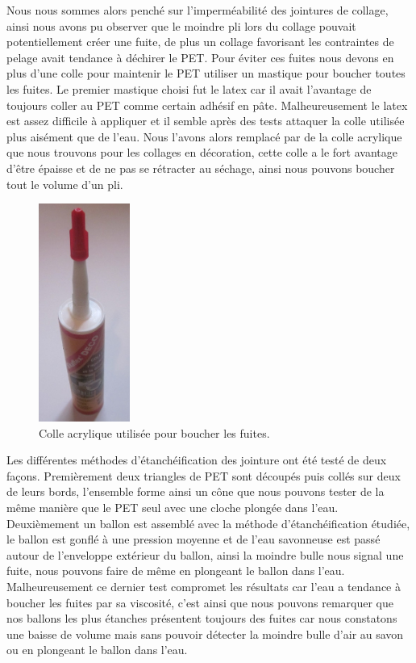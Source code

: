 \documentclass[a4paper,11pt]{article}
\begin{document}
Nous nous sommes alors penché sur l’imperméabilité des jointures de collage, ainsi nous avons pu observer que le moindre pli lors du collage pouvait potentiellement créer une fuite, de plus un collage favorisant les contraintes de pelage avait tendance à déchirer le PET. Pour éviter ces fuites nous devons en plus d'une colle pour maintenir le PET utiliser un mastique pour boucher toutes les fuites. Le premier mastique choisi fut le latex car il avait l'avantage de toujours coller au PET comme certain adhésif en pâte. Malheureusement le latex est assez difficile à appliquer et il semble après des tests attaquer la colle utilisée plus aisément que de l'eau. Nous l'avons alors remplacé par de la colle acrylique que nous trouvons pour les collages en décoration, cette colle a le fort avantage d'être épaisse et de ne pas se rétracter au séchage, ainsi nous pouvons boucher tout le volume d'un pli.

\begin{figure}[H]
 \centering
 \includegraphics[width=3cm]{../Images/colle_acrylique.JPG}
 \caption{Colle acrylique utilisée pour boucher les fuites.}
\end{figure}


Les différentes méthodes d'étanchéification des jointure ont été testé de deux façons.
Premièrement deux triangles de PET sont découpés puis collés sur deux de leurs bords, l'ensemble forme ainsi un cône que nous pouvons tester de la même manière que le PET seul avec une cloche plongée dans l'eau.
Deuxièmement un ballon est assemblé avec la méthode d'étanchéification étudiée, le ballon est gonflé à une pression moyenne et de l'eau savonneuse est passé autour de l'enveloppe extérieur du ballon, ainsi la moindre bulle nous signal une fuite, nous pouvons faire de même en plongeant le ballon dans l'eau. Malheureusement ce dernier test compromet les résultats car l'eau a tendance à boucher les fuites par sa viscosité, c'est ainsi que nous pouvons remarquer que nos ballons les plus étanches présentent toujours des fuites car nous constatons une baisse de volume mais sans pouvoir détecter la moindre bulle d'air au savon ou en plongeant le ballon dans l'eau.
\end{document}

